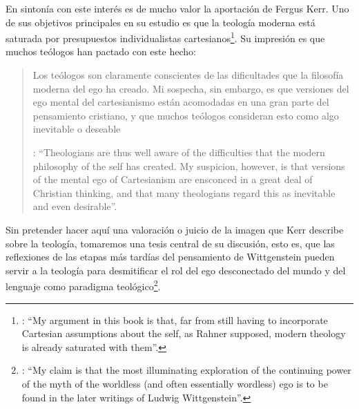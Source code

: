 En sintonía con este interés es de mucho valor la aportación de Fergus Kerr. Uno de sus objetivos principales en su estudio es que la teología moderna está saturada por presupuestos individualistas cartesianos\footnote{\cite[Cf.][8]{kerr1997theo}: \enquote{My argument in this book is that, far from still having to incorporate Cartesian assumptions about the self, as Rahner supposed, modern theology is already saturated with them}.}. Su impresión es que muchos teólogos han pactado con este hecho:\blockquote[{\Cite[10]{kerr1997theo}}: \enquote{Theologians are thus well aware of the difficulties that the modern philosophy of the self has created. My suspicion, however, is that versions of the mental ego of Cartesianism are ensconced in a great deal of Christian thinking, and that many theologians regard this as inevitable and even desirable}.]{Los teólogos son claramente conscientes de las dificultades que la filosofía moderna del ego ha creado. Mi sospecha, sin embargo, es que versiones del ego mental del cartesianismo están acomodadas en una gran parte del pensamiento cristiano, y que muchos teólogos consideran esto como algo inevitable o deseable}. Sin pretender hacer aquí una valoración o juicio de la imagen que Kerr describe sobre la teología, tomaremos una tesis central de su discusión, esto es, que las reflexiones de las etapas más tardías del pensamiento de Wittgenstein pueden servir a la teología para desmitificar el rol del ego desconectado del mundo y del lenguaje como paradigma teológico\footnote{\cite[Cf.][23]{kerr1997theo}: \enquote{My claim is that the most illuminating exploration of the continuing power of the myth of the worldless (and often essentially wordless) ego is to be found in the later writings of Ludwig Wittgenstein}.}.

